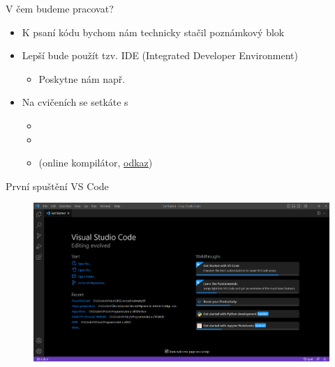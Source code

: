 \documentclass[14pt]{beamer}
\begin{document}
    \begin{frame}[t]{V čem budeme pracovat?}
        \begin{itemize}
            \item K psaní kódu bychom nám technicky stačil poznámkový blok
            \begin{center}
            \end{center}
            \item Lepší bude použít tzv. IDE (Integrated Developer Environment)
            \begin{itemize}
                \item Poskytne nám např. 
            \end{itemize}
            \item Na cvičeních se setkáte s
            \begin{itemize}
                \item {} 
                \item {}
                \item {} (online kompilátor, \href{https://www.onlinegdb.com/online_c_compiler}{\underline{odkaz}})
            \end{itemize}
        \end{itemize}
    \end{frame}
    
    \begin{frame}[t]{První spuštění VS Code}
        \begin{figure}
            \centering
            \includegraphics[width=.9\textwidth]{images/vs_code_first_launch.png}
        \end{figure}
    \end{frame}
\end{document}

